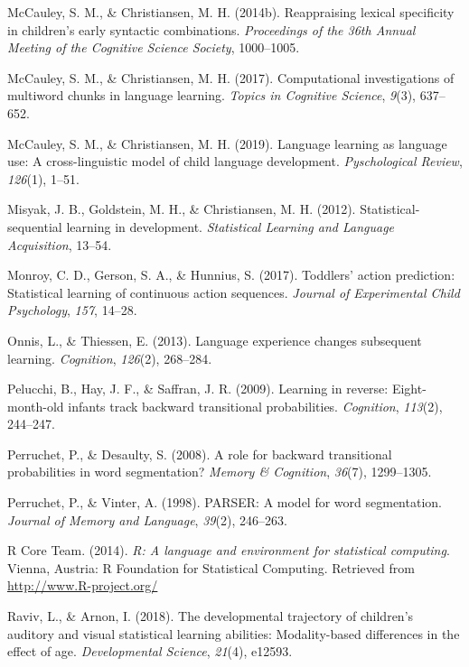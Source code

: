 \documentclass[man,mask,floatsintext]{apa6}
\begin{document}
\hypertarget{ref-mccauley2014reappraising}{}
McCauley, S. M., \& Christiansen, M. H. (2014b). Reappraising lexical
specificity in children's early syntactic combinations.
\emph{Proceedings of the 36th Annual Meeting of the Cognitive Science
Society}, 1000--1005.

\hypertarget{ref-mccauley2017computational}{}
McCauley, S. M., \& Christiansen, M. H. (2017). Computational
investigations of multiword chunks in language learning. \emph{Topics in
Cognitive Science}, \emph{9}(3), 637--652.

\hypertarget{ref-mccauley2019languagelearning}{}
McCauley, S. M., \& Christiansen, M. H. (2019). Language learning as
language use: A cross-linguistic model of child language development.
\emph{Pyschological Review}, \emph{126}(1), 1--51.

\hypertarget{ref-misyak2012statistical}{}
Misyak, J. B., Goldstein, M. H., \& Christiansen, M. H. (2012).
Statistical-sequential learning in development. \emph{Statistical
Learning and Language Acquisition}, 13--54.

\hypertarget{ref-monroy2017toddlers}{}
Monroy, C. D., Gerson, S. A., \& Hunnius, S. (2017). Toddlers' action
prediction: Statistical learning of continuous action sequences.
\emph{Journal of Experimental Child Psychology}, \emph{157}, 14--28.

\hypertarget{ref-onnis2013language}{}
Onnis, L., \& Thiessen, E. (2013). Language experience changes
subsequent learning. \emph{Cognition}, \emph{126}(2), 268--284.

\hypertarget{ref-pelucchi2009learning}{}
Pelucchi, B., Hay, J. F., \& Saffran, J. R. (2009). Learning in reverse:
Eight-month-old infants track backward transitional probabilities.
\emph{Cognition}, \emph{113}(2), 244--247.

\hypertarget{ref-perruchet2008role}{}
Perruchet, P., \& Desaulty, S. (2008). A role for backward transitional
probabilities in word segmentation? \emph{Memory \& Cognition},
\emph{36}(7), 1299--1305.

\hypertarget{ref-perruchet1998parser}{}
Perruchet, P., \& Vinter, A. (1998). PARSER: A model for word
segmentation. \emph{Journal of Memory and Language}, \emph{39}(2),
246--263.

\hypertarget{ref-R}{}
R Core Team. (2014). \emph{R: A language and environment for statistical
computing}. Vienna, Austria: R Foundation for Statistical Computing.
Retrieved from \url{http://www.R-project.org/}

\hypertarget{ref-raviv2018developmental}{}
Raviv, L., \& Arnon, I. (2018). The developmental trajectory of
children's auditory and visual statistical learning abilities:
Modality-based differences in the effect of age. \emph{Developmental
Science}, \emph{21}(4), e12593.
\end{document}
